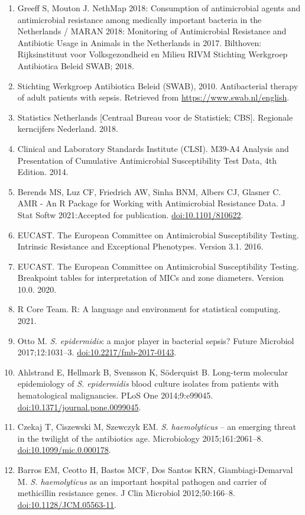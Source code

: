 \documentclass[
]{book}
\begin{document}
\begin{enumerate}
\item
  Greeff S, Mouton J. NethMap 2018: Consumption of antimicrobial agents and antimicrobial resistance among medically important bacteria in the Netherlands / MARAN 2018: Monitoring of Antimicrobial Resistance and Antibiotic Usage in Animals in the Netherlands in 2017. Bilthoven: Rijksinstituut voor Volksgezondheid en Milieu RIVM Stichting Werkgroep Antibiotica Beleid SWAB; 2018.
\item
  Stichting Werkgroep Antibiotica Beleid (SWAB), 2010. Antibacterial therapy of adult patients with sepsis. Retrieved from \url{https://www.swab.nl/english}.
\item
  Statistics Netherlands {[}Centraal Bureau voor de Statistiek; CBS{]}. Regionale kerncijfers Nederland. 2018.
\item
  Clinical and Laboratory Standards Institute (CLSI). M39-A4 Analysis and Presentation of Cumulative Antimicrobial Susceptibility Test Data, 4th Edition. 2014.
\item
  Berends MS, Luz CF, Friedrich AW, Sinha BNM, Albers CJ, Glasner C. AMR - An R Package for Working with Antimicrobial Resistance Data. J Stat Softw 2021:Accepted for publication. \url{doi:10.1101/810622}.
\item
  EUCAST. The European Committee on Antimicrobial Susceptibility Testing. Intrinsic Resistance and Exceptional Phenotypes. Version 3.1. 2016.
\item
  EUCAST. The European Committee on Antimicrobial Susceptibility Testing. Breakpoint tables for interpretation of MICs and zone diameters. Version 10.0. 2020.
\item
  R Core Team. R: A language and environment for statistical computing. 2021.
\item
  Otto M. \emph{S. epidermidis}: a major player in bacterial sepsis? Future Microbiol 2017;12:1031--3. \url{doi:10.2217/fmb-2017-0143}.
\item
  Ahlstrand E, Hellmark B, Svensson K, Söderquist B. Long-term molecular epidemiology of \emph{S. epidermidis} blood culture isolates from patients with hematological malignancies. PLoS One 2014;9:e99045. \url{doi:10.1371/journal.pone.0099045}.
\item
  Czekaj T, Ciszewski M, Szewczyk EM. \emph{S. haemolyticus} -- an emerging threat in the twilight of the antibiotics age. Microbiology 2015;161:2061--8. \url{doi:10.1099/mic.0.000178}.
\item
  Barros EM, Ceotto H, Bastos MCF, Dos Santos KRN, Giambiagi-Demarval M. \emph{S. haemolyticus} as an important hospital pathogen and carrier of methicillin resistance genes. J Clin Microbiol 2012;50:166--8. \url{doi:10.1128/JCM.05563-11}.

\end{enumerate}
\end{document}
